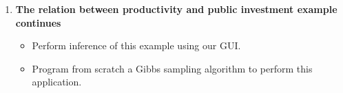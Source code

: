 \begin{enumerate}[leftmargin=*]
	\item \textbf{The relation between productivity and public investment example continues}

\begin{itemize}
	\item Perform inference of this example using our GUI.
	\item Program from scratch a Gibbs sampling algorithm to perform this application. 
\end{itemize} 

\end{enumerate}